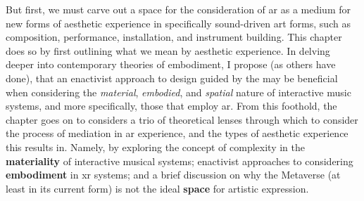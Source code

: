 But first, we must carve out a space for the consideration of \gls{ar} as a medium for new forms of aesthetic experience in specifically sound-driven art forms, such as composition, performance, installation, and instrument building. This chapter does so by first outlining what we mean by aesthetic experience. In delving deeper into contemporary theories of embodiment, I propose (as others have done), that an enactivist approach to design guided by the  may be beneficial when considering the \textit{material}, \textit{embodied}, and \textit{spatial} nature of interactive music systems, and more specifically, those that employ \gls{ar}. From this foothold, the chapter goes on to considers a trio of theoretical lenses through which to consider the process of mediation in \gls{ar} experience, and the types of aesthetic experience this results in. Namely, by exploring the concept of complexity in the \textbf{materiality} of interactive musical systems; enactivist approaches to considering \textbf{embodiment} in \gls{xr} systems; and a brief discussion on why the Metaverse (at least in its current form) is not the ideal \textbf{space} for artistic expression.



